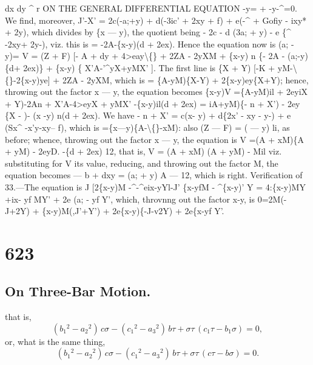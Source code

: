 \documentclass[11pt,a4paper]{book}
\begin{document}
dx
dy
\textasciicircum{}
r
ON THE GENERAL DIFFERENTIAL EQUATION -y= + -y-\textasciicircum{}=0.
We
find, moreover,
J'-X' = 2c(-a;+y) + d(-3ic' + 2xy + f) + e(-\textasciicircum{} + Gofiy - ixy* + 2y\guillemotright{}),
which divides by \{x --- y), the quotient being
- 2c - d (3a; + y) - e \{\textasciicircum{} -2xy+ 2y-),
viz.
this
is
= -2A-\{x-y)(d + 2ex).
Hence the equation now
is
(a; - y)= V = (Z + F) [- A + dy + 4>eay\textbackslash\{\} + 2ZA - 2yXM
+ \{x-y) n \{- 2A - (a;-y)\{d+ 2ex)\}
+ \{x-y)
\{
X'A-'\textasciicircum{}yX+yMX'
].
The
first
line
is
\{X + Y) [-K + yM-\textbackslash\{\}-2\{x-y)ye] + 2ZA - 2yXM,
which
is
= \{A-yM)\{X-Y) + 2\{x-y)ey\{X+Y);
hence, throwing out the
factor x --- y, the equation becomes
\{x-y)V =\{A-yM)il + 2eyiX + Y)-2An + X'A-4>eyX + yMX' -\{x-y)il(d + 2ex)
= iA+yM)\{- n + X') - 2ey \{X - \textyen{})- (x -y) n(d + 2ex).
We have
- n + X' = c(x- y) + d\{2x' - xy - y-) + e (Sx\textasciicircum{} -x'y-xy-- f),
which
is =\{x---y)\{A-\textbackslash\{\}-xM):
also (Z --- F) = (\guillemotleft{} --- y) li,
as
before;
whence, throwing out
the
factor x --- y, the equation
is
V =(A + xM)\{A + yM) - 2eyD. -\{d + 2ex) 12,
that
is,
V = (A + xM) (A + yM) - Mil
viz.
substituting
for
V
its
value,
reducing,
and
throwing
out
the
factor
M,
the
equation becomes
--- b + dxy = (a; + y) A --- 12,
which
is
right.
Verification of 33.---The equation
is
J [2\{x-y)M -\textasciicircum{}-\textasciicircum{}eix-yYl-J' \{x-yfM - \textasciicircum{}\{x-y)' Y
= 4:\{x-y)MY +ix- yf MY' + 2e (a; - yf Y',
which, throvnng out the factor x-y,
is
0=2M(-J+2Y) + \{x-y)M(,J'+Y') + 2e\{x-y)\{-J-v2Y) + 2e\{x-yf Y'.
\clearpage


\section*{623}
\subsection*{On Three-Bar Motion.\quad [Continued]}

\setcounter{equation}{0}
\noindent
that is,
\[
(b_1{}^{\!2} - a_2{}^{\!2})\, c\sigma - (c_1{}^{\!2} - a_3{}^{\!2})\, b\tau + \sigma\tau\, (c_1\tau - b_1\sigma) = 0,
\]
or, what is the same thing,
\[
(b_1{}^{\!2} - a_2{}^{\!2})\, c\sigma - (c_1{}^{\!2} - a_3{}^{\!2})\, b\tau + \sigma\tau\, (c\tau - b\sigma) = 0.
\]
\end{document}
